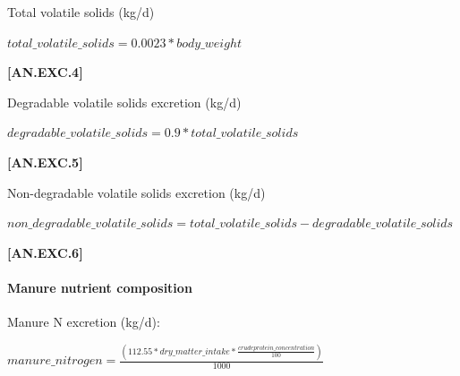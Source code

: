 \begin{refsection}
\begin{itemize}
Total volatile solids (kg/d)
        \vspace{0.5cm}
    
    \begin{center}
        \(total\_volatile\_solids=0.0023 * body\_weight\)
    \end{center}
        \vspace{0.5cm} 
    
            {\raggedleft \textbf{[AN.EXC.4]}\par}
            \vspace{0.5cm}  

Degradable volatile solids excretion (kg/d)
        \vspace{0.5cm}
    
    \begin{center}
        \(degradable\_volatile\_solids=0.9 * total\_volatile\_solids\)
    \end{center}
        \vspace{0.5cm} 
    
            {\raggedleft \textbf{[AN.EXC.5]}\par}
            \vspace{0.5cm}  

Non-degradable volatile solids excretion (kg/d)
        \vspace{0.5cm}
    
    \begin{center}
        \(non\_degradable\_volatile\_solids = total\_volatile\_solids - degradable\_volatile\_solids\)
    \end{center}
        \vspace{0.5cm} 
    
            {\raggedleft \textbf{[AN.EXC.6]}\par}
            \vspace{0.5cm} 

\paragraph{Manure nutrient composition}
\vspace{-0.25cm}

Manure N excretion (kg/d): 
        \vspace{0.5cm}
    
    \begin{center}
        \(manure\_nitrogen=\frac{(112.55 * dry\_matter\_intake * \frac{crude protein\_concentration}{100})}{1000} \)
    \end{center}
        \vspace{0.5cm} 
    

\end{itemize}
\end{refsection}
